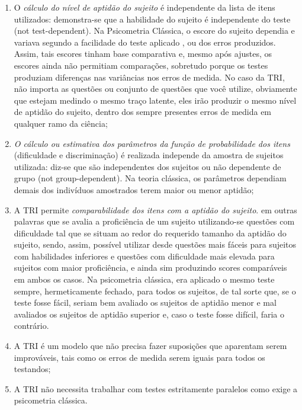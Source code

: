 \documentclass[
	article,			%
	11pt,				%
	oneside,			%
	a4paper,			%
	english,			%
	brazil,				%
	sumario=tradicional
]{abntex2}
\begin{document}
				\begin{enumerate}[label=\alph*)]
					\item O \textit{cálculo do nível de aptidão do sujeito} é independente da lista de itens utilizados: demonstra-se
					que a habilidade do sujeito é independente do teste (not test-dependent). Na
					Psicometria Clássica, o escore do sujeito dependia e variava segundo a facilidade do teste aplicado
					, ou dos erros produzidos. Assim, tais escores tinham base comparativa e, mesmo após ajustes, os escores ainda
					não permitiam comparações, sobretudo porque os testes produziam diferenças nas
					variâncias nos erros de medida. No caso da TRI, não importa as questões ou conjunto de
					questões que você utilize, obviamente que estejam medindo o mesmo traço latente, eles
					irão produzir o mesmo nível de aptidão do sujeito, dentro dos sempre
					presentes erros de medida em qualquer ramo da ciência;
					
					\item \textit{O cálculo ou estimativa dos parâmetros da função de probabilidade dos itens} (dificuldade e discriminação) é realizada independe da amostra de sujeitos utilizada: diz-se que são independentes dos
					sujeitos ou não dependente de grupo (not group-dependent). Na teoria clássica, os parâmetros dependiam demais dos indivíduos amostrados terem maior ou menor aptidão;
					
					\item A TRI permite \textit{comparabilidade dos itens com a aptidão do sujeito}. em outras palavras que se avalia
					a proficiência de um sujeito utilizando-se questões com dificuldade tal que se situam ao redor do requerido
					tamanho da aptidão do sujeito, sendo, assim, possível utilizar desde questões mais fáceis para sujeitos com habilidades inferiores e questões com dificuldade mais elevada para sujeitos com maior proficiência, e ainda sim
					produzindo scores comparáveis em ambos os casos. Na psicometria clássica, era aplicado o mesmo teste sempre, hermeticamente fechado, para todos os sujeitos, de tal sorte que, se o teste fosse fácil, seriam bem avaliado os sujeitos de aptidão menor e mal avaliados os sujeitos de aptidão superior e, caso o teste fosse difícil, faria o contrário.
					
					\item A TRI é um modelo que não precisa fazer suposições que aparentam serem
					improváveis, tais como os erros de medida serem iguais para todos os testandos;
					
					\item A TRI não necessita trabalhar com testes estritamente paralelos como exige a
					psicometria clássica.
				\end{enumerate}
			
\end{document}
